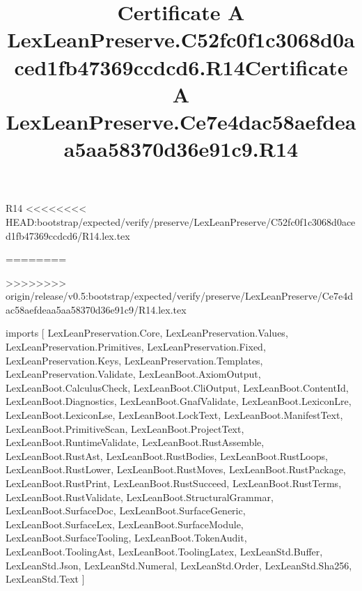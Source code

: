 \begin{lexlean}{R14}
<<<<<<<< HEAD:bootstrap/expected/verify/preserve/LexLeanPreserve/C52fc0f1c3068d0aced1fb47369ccdcd6/R14.lex.tex
\title{Certificate A LexLeanPreserve.C52fc0f1c3068d0aced1fb47369ccdcd6.R14}
========
\title{Certificate A LexLeanPreserve.Ce7e4dac58aefdeaa5aa58370d36e91c9.R14}
>>>>>>>> origin/release/v0.5:bootstrap/expected/verify/preserve/LexLeanPreserve/Ce7e4dac58aefdeaa5aa58370d36e91c9/R14.lex.tex
\begin{coremodule}
imports [
  LexLeanPreservation.Core,
  LexLeanPreservation.Values,
  LexLeanPreservation.Primitives,
  LexLeanPreservation.Fixed,
  LexLeanPreservation.Keys,
  LexLeanPreservation.Templates,
  LexLeanPreservation.Validate,
  LexLeanBoot.AxiomOutput,
  LexLeanBoot.CalculusCheck,
  LexLeanBoot.CliOutput,
  LexLeanBoot.ContentId,
  LexLeanBoot.Diagnostics,
  LexLeanBoot.GnafValidate,
  LexLeanBoot.LexiconLre,
  LexLeanBoot.LexiconLse,
  LexLeanBoot.LockText,
  LexLeanBoot.ManifestText,
  LexLeanBoot.PrimitiveScan,
  LexLeanBoot.ProjectText,
  LexLeanBoot.RuntimeValidate,
  LexLeanBoot.RustAssemble,
  LexLeanBoot.RustAst,
  LexLeanBoot.RustBodies,
  LexLeanBoot.RustLoops,
  LexLeanBoot.RustLower,
  LexLeanBoot.RustMoves,
  LexLeanBoot.RustPackage,
  LexLeanBoot.RustPrint,
  LexLeanBoot.RustSucceed,
  LexLeanBoot.RustTerms,
  LexLeanBoot.RustValidate,
  LexLeanBoot.StructuralGrammar,
  LexLeanBoot.SurfaceDoc,
  LexLeanBoot.SurfaceGeneric,
  LexLeanBoot.SurfaceLex,
  LexLeanBoot.SurfaceModule,
  LexLeanBoot.SurfaceTooling,
  LexLeanBoot.TokenAudit,
  LexLeanBoot.ToolingAst,
  LexLeanBoot.ToolingLatex,
  LexLeanStd.Buffer,
  LexLeanStd.Json,
  LexLeanStd.Numeral,
  LexLeanStd.Order,
  LexLeanStd.Sha256,
  LexLeanStd.Text
]


\end{coremodule}
\end{lexlean}
